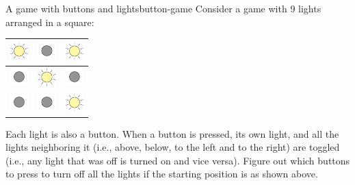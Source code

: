 \begin{example}{A game with buttons and lights}{button-game}
  Consider a game with 9 lights arranged in a square:
  \begin{center}
    \begin{tabular}{|c|c|c|}
      \hline
      \rule{0ex}{8.5mm}\includegraphics[width=7mm]{figures/lighton} &
      \rule{0ex}{8.5mm}\includegraphics[width=7mm]{figures/lightoff} &
      \rule{0ex}{8.5mm}\includegraphics[width=7mm]{figures/lighton} \\\hline 
      \rule{0ex}{8.5mm}\includegraphics[width=7mm]{figures/lightoff} &
      \rule{0ex}{8.5mm}\includegraphics[width=7mm]{figures/lighton} &
      \rule{0ex}{8.5mm}\includegraphics[width=7mm]{figures/lightoff} \\\hline 
      \rule{0ex}{8.5mm}\includegraphics[width=7mm]{figures/lightoff} &
      \rule{0ex}{8.5mm}\includegraphics[width=7mm]{figures/lightoff} &
      \rule{0ex}{8.5mm}\includegraphics[width=7mm]{figures/lighton} \\\hline 
    \end{tabular}
  \end{center}
  Each light is also a button. When a button is pressed, its own
  light, and all the lights neighboring it (i.e., above, below, to the
  left and to the right) are toggled (i.e., any light that was off is
  turned on and vice versa). Figure out which buttons to press to
  turn off all the lights if the starting position is as shown above.
\end{example}

